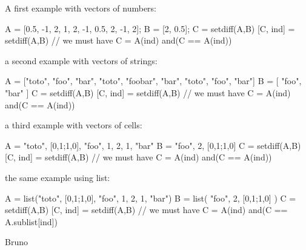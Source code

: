 \begin{examples}

\noindent A first example with vectors of numbers:
  
  \begin{program}
    A = [0.5, -1, 2, 1, 2, -1, 0.5, 2, -1, 2];
    B = [2, 0.5];
    C = setdiff(A,B)
    [C, ind] = setdiff(A,B)
    // we must have C = A(ind)
    and(C == A(ind))
  \end{program}

\noindent   a second example with vectors of strings:
  
  \begin{program}
    A = ["toto", "foo", "bar", "toto", "foobar", "bar", "toto", "foo", "bar"]
    B = [ "foo", "bar" ]
    C = setdiff(A,B)
    [C, ind] = setdiff(A,B)
    // we must have C = A(ind)
    and(C == A(ind))
  \end{program}

\noindent   a third example with vectors of cells:
  
  \begin{program}
    A = {"toto", [0,1;1,0], "foo", 1, 2, 1, "bar"}
    B = { "foo", 2,  [0,1;1,0] }
    C = setdiff(A,B)
    [C, ind] = setdiff(A,B)
    // we must have C = A(ind)
    and(C == A(ind))
  \end{program}

\noindent   the same example using list:
  
  \begin{program}
    A = list("toto", [0,1;1,0], "foo", 1, 2, 1, "bar")
    B = list( "foo", 2,  [0,1;1,0] )
    C = setdiff(A,B)
    [C, ind] = setdiff(A,B)
    // we must have C = A(ind)
    and(C == A.sublist[ind])
  \end{program}

\end{examples}

\begin{manseealso}
\end{manseealso}

\begin{authors}
   Bruno
\end{authors}
